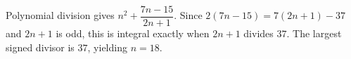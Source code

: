 Polynomial division gives $n^2+\dfrac{7n-15}{2n+1}$. Since $2(7n-15)=7(2n+1)-37$ and $2n+1$ is odd, this is integral exactly when $2n+1$ divides $37$. The largest signed divisor is $37$, yielding $\boxed{n=18}$.
